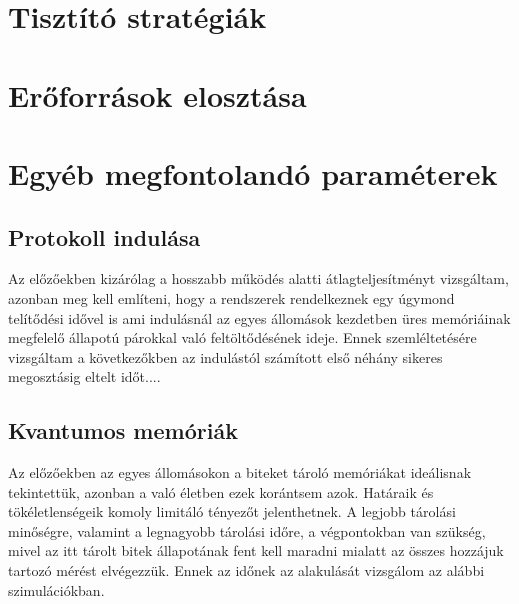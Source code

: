\section{Tisztító stratégiák}

\section{Erőforrások elosztása}

\section{Egyéb megfontolandó paraméterek}
\subsection{Protokoll indulása}
Az előzőekben kizárólag a hosszabb működés alatti átlagteljesítményt vizsgáltam, azonban meg kell említeni, hogy a rendszerek rendelkeznek egy úgymond telítődési idővel is ami indulásnál az egyes állomások kezdetben üres memóriáinak megfelelő állapotú párokkal való feltöltődésének ideje. Ennek szemléltetésére vizsgáltam a következőkben az indulástól számított első néhány sikeres megosztásig eltelt időt....

\subsection{Kvantumos memóriák}
Az előzőekben az egyes állomásokon a biteket tároló memóriákat ideálisnak tekintettük, azonban a való életben ezek korántsem azok. Határaik és tökéletlenségeik komoly limitáló tényezőt jelenthetnek. A legjobb tárolási minőségre, valamint a legnagyobb tárolási időre, a végpontokban van szükség, mivel az itt tárolt bitek állapotának fent kell maradni mialatt az összes hozzájuk tartozó mérést elvégezzük. Ennek az időnek az alakulását vizsgálom az alábbi szimulációkban.

